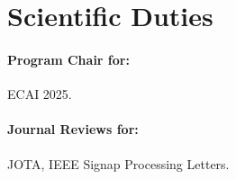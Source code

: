 \section{Scientific Duties}

\paragraph{Program Chair for:} ECAI 2025.

\paragraph{Journal Reviews for:} JOTA, IEEE Signap Processing Letters.

